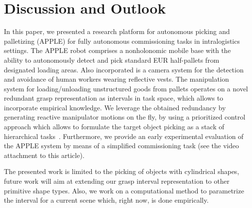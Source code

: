 \section{Discussion and Outlook}
\label{sec:discussion}
%
In this paper, we presented a research platform for autonomous picking and palletizing (APPLE) for
fully autonomous commissioning tasks in intralogistics settings. The APPLE robot comprises a
nonholonomic mobile base with the ability to autonomously detect and pick standard EUR half-pallets
from designated loading areas. Also incorporated is a camera system for the detection and avoidance
of human workers wearing reflective vests. The manipulation system for loading/unloading
unstructured goods from pallets operates on a novel redundant grasp representation as intervals in
task space, which allows to incorporate empirical knowledge. We leverage the obtained redundancy by
generating reactive manipulator motions on the fly, by using a prioritized control approach which
allows to formulate the target object picking as a stack of hierarchical
tasks~\cite{Kano11}. Furthermore, we provide an early experimental evaluation of the APPLE system by
means of a simplified commissioning task (see the video attachment to this article).

The presented work is limited to the picking of objects with cylindrical shapes, future work will
aim at extending our grasp interval representation to other primitive shape types. Also, we work on
a computational method to parametrize the interval for a current scene which, right now, is done
empirically. 


